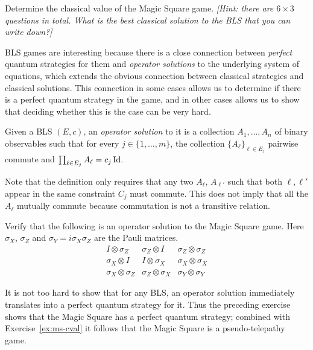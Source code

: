 \begin{exercise}\label{ex:ms-cval}
Determine the classical value of the Magic Square game. \emph{[Hint: there are $6\times 3$ questions in total. What is the best classical solution  to the BLS that you can write down?]}
\end{exercise}

BLS games are interesting because there is a close connection between \emph{perfect} quantum strategies for them and \emph{operator solutions} to the underlying system of equations, which extends the obvious connection between classical strategies and classical solutions. This connection in some cases allows us to determine if there is a perfect quantum strategy in the game, and in other cases allows us to show that deciding whether this is the case can be very hard. 

\begin{definition}
Given a BLS $(E,c)$, an \emph{operator solution} to it is a collection $A_1,\ldots,A_n$ of binary observables such that for every $j\in\{1,\ldots,m\}$, the collection $\{A_\ell\}_{\ell\in E_j}$ pairwise commute and $\prod_{\ell\in E_j} A_{\ell} = c_j \mathop{\rm Id}\nolimits$. 
\end{definition}

Note that the definition only requires that any two $A_\ell$, $A_{\ell'}$ such that both $\ell,\ell'$ appear in the same constraint $C_j$ must commute. This does not imply that all the $A_\ell$ mutually commute because commutation is not a transitive relation. 

\begin{exercise}
Verify that the following is an operator solution to the Magic Square game. Here $\sigma_X$, $\sigma_Z$ and $\sigma_Y = i\sigma_X\sigma_Z$ are the Pauli matrices. 
\begin{equation}\label{eq:opsol-ms}
 \begin{matrix} I\otimes \sigma_Z & \sigma_Z \otimes I & \sigma_Z \otimes \sigma_Z \\
\sigma_X \otimes I & I \otimes \sigma_X & \sigma_X\otimes \sigma_X\\
\sigma_X \otimes \sigma_Z & \sigma_Z \otimes \sigma_X & \sigma_Y \otimes \sigma_Y 
\end{matrix}
\end{equation}
\end{exercise}

It is not too hard to show that for any BLS, an operator solution immediately translates into a perfect quantum strategy for it. Thus the preceding exercise shows that the Magic Square has a perfect quantum strategy; combined with Exercise~\ref{ex:ms-cval} it follows that the Magic Square is a pseudo-telepathy game.  

